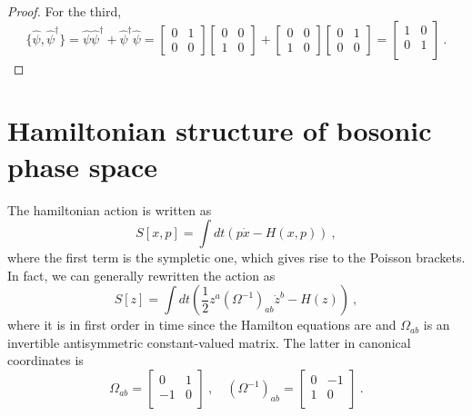 \begin{proof}
        For the third, 
        \begin{equation*}
            \{\hat \psi, \hat \psi^\dagger \} = \hat \psi \hat \psi^\dagger + \hat \psi^\dagger \hat \psi = \begin{bmatrix} 0 & 1 \\ 0 & 0 \end{bmatrix} \begin{bmatrix} 0 & 0 \\ 1 & 0 \end{bmatrix} + \begin{bmatrix} 0 & 0 \\ 1 & 0\end{bmatrix} \begin{bmatrix} 0 & 1 \\ 0 & 0 \end{bmatrix} = \begin{bmatrix}
                1 & 0 \\ 0 & 1 \\
            \end{bmatrix} ~.
        \end{equation*}
    \end{proof}

\section{Hamiltonian structure of bosonic phase space}

    The hamiltonian action is written as 
    \begin{equation*}
        S[x, p] = \int dt (p \dot x - H(x, p)) ~,
    \end{equation*}
    where the first term is the sympletic one, which gives rise to the Poisson brackets. In fact, we can generally rewritten the action as 
    \begin{equation*}
        S[z] = \int dt (\frac{1}{2} z^a (\Omega^{-1})_{ab} \dot z^b - H(z)) ~,
    \end{equation*}
    where it is in first order in time since the Hamilton equations are and $\Omega_{ab}$ is an invertible antisymmetric constant-valued matrix. The latter in canonical coordinates is 
    \begin{equation*}
        \Omega_{ab} = \begin{bmatrix}
            0 & 1  \\ -1 & 0 \\
        \end{bmatrix} ~, \quad (\Omega^{-1})_{ab} = \begin{bmatrix}
            0 & -1  \\ 1 & 0 \\
        \end{bmatrix} ~.
    \end{equation*}

